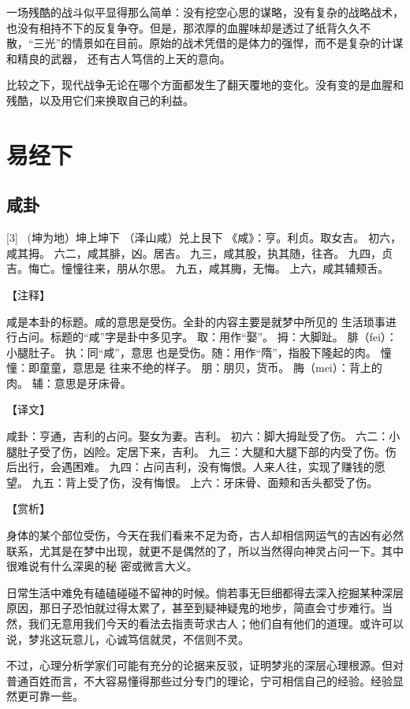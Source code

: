 \documentclass[12pt,UTF8]{ctexbook}
\begin{document}
一场残酷的战斗似平显得那么简单：没有挖空心思的谋略，没有复杂的战略战术，也没有相持不下的反复争夺。但是，那浓厚的血腥味却是透过了纸背久久不散，“三光”的情景如在目前。原始的战术凭借的是体力的强悍，而不是复杂的计谋和精良的武器， 还有古人笃信的上天的意向。

比较之下，现代战争无论在哪个方面都发生了翻天覆地的变化。没有变的是血腥和残酷，以及用它们来换取自己的利益。

\part{易经下}

\chapter{咸卦}
[3] \ (坤为地）坤上坤下
（泽山咸）兑上艮下
《咸》：亨。利贞。取女吉。
初六，咸其拇。
六二，咸其腓，凶。居吉。
九三，咸其股，执其随，往吝。
九四，贞吉。悔亡。憧憧往来，朋从尔思。
九五，咸其脢，无悔。
上六，咸其辅颊舌。

【注释】

咸是本卦的标题。咸的意思是受伤。全卦的内容主要是就梦中所见的 生活琐事进行占问。标题的“咸”字是卦中多见字。
取：用作“娶”。
拇：大脚趾。
腓（fei）：小腿肚子。
执：同“咸”，意思 也是受伤。随：用作“隋”，指股下隆起的肉。
憧憧：即童童，意思是 往来不绝的样子。
朋：朋贝，货币。
脢（mei）：背上的肉。
辅：意思是牙床骨。

【译文】

咸卦：亨通，吉利的占问。娶女为妻。吉利。
初六：脚大拇趾受了伤。
六二：小腿肚子受了伤，凶险。定居下来，吉利。
九三：大腿和大腿下部的内受了伤。伤后出行，会遇困难。
九四：占问吉利，没有悔恨。人来人往，实现了赚钱的愿望。
九五：背上受了伤，没有悔恨。
上六：牙床骨、面颊和舌头都受了伤。

【赏析】

身体的某个部位受伤，今天在我们看来不足为奇，古人却相信网运气的吉凶有必然联系，尤其是在梦中出现，就更不是偶然的了，所以当然得向神灵占问一下。其中很难说有什么深奥的秘 密或微言大义。

日常生活中难免有磕磕碰碰不留神的时候。倘若事无巨细都得去深入挖掘某种深层原因，那日子恐怕就过得太累了，甚至到疑神疑鬼的地步，简直会寸步难行。当然，我们无意用我们今天的看法去指责苛求古人；他们自有他们的道理。或许可以说，梦兆这玩意儿，心诚笃信就灵，不信则不灵。

不过，心理分析学家们可能有充分的论据来反驳，证明梦兆的深层心理根源。但对普通百姓而言，不大容易懂得那些过分专门的理论，宁可相信自己的经验。经验显然更可靠一些。
\end{document}
